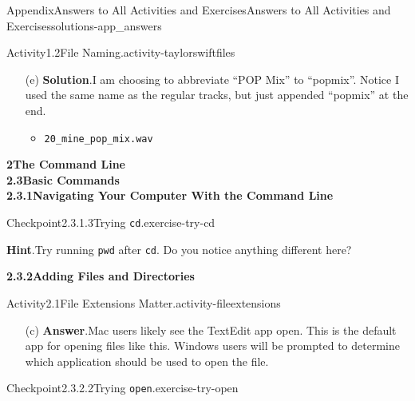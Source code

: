 \documentclass[oneside,10pt,]{book}
\newcommand{\blocktitlefont}{\relax}
\newcommand{\mono}[1]{\texttt{#1}}
\begin{document}
\begin{solutions-chapter}{Appendix}{Answers to All Activities and Exercises}{}{Answers to All Activities and Exercises}{}{}{solutions-app_answers}
\begin{activitysolution}{Activity}{1.2}{File Naming.}{activity-taylorswiftfiles}
\begin{enumerate}[font=\bfseries,label=(\alph*),ref=\alph*]
\begin{itemize}[label=\textbullet]
\item{}\mono{18\_back\_to\_dec\_acoust.wav}%
\item{}\mono{19\_haunted\_acoust.wav}%
\end{itemize}
%
\item[(e)]\noindent\textbf{\blocktitlefont Solution}.\hypertarget{solution-taylorswiftfiles-h-b-back}{}\quad{}I am choosing to abbreviate ``POP Mix'' to ``pop\textunderscore{}mix''. Notice I used the same name as the regular tracks, but just appended ``\textunderscore{}pop\textunderscore{}mix'' at the end.%
\begin{itemize}[label=\textbullet]
\item{}\mono{20\_mine\_pop\_mix.wav}%
\end{itemize}
%
\end{enumerate}%
\end{activitysolution}%
\par\medskip
\noindent\textbf{\Large{}2\space\textperiodcentered\space{}The Command Line\\
2.3\space\textperiodcentered\space{}Basic Commands\\
2.3.1\space\textperiodcentered\space{}Navigating Your Computer With the Command Line}
\begin{inlinesolution}{Checkpoint}{2.3.1.3}{Trying \mono{cd}.}{exercise-try-cd}%
\par\smallskip%
\noindent\textbf{\blocktitlefont Hint}.\hypertarget{hint-try-cd-c-back}{}\quad{}Try running \mono{pwd} after \mono{cd}. Do you notice anything different here?%
\end{inlinesolution}%
\par\medskip
\noindent\textbf{\Large{}2.3.2\space\textperiodcentered\space{}Adding Files and Directories}
\begin{activitysolution}{Activity}{2.1}{File Extensions Matter.}{activity-fileextensions}%
\begin{enumerate}[font=\bfseries,label=(\alph*),ref=\alph*]%
\item[(c)]\noindent\textbf{\blocktitlefont Answer}.\hypertarget{answer-fileextensions-g-b-back}{}\quad{}Mac users likely see the TextEdit app open. This is the default app for opening files like this. Windows users will be prompted to determine which application should be used to open the file.%
\end{enumerate}%
\end{activitysolution}%
\begin{inlinesolution}{Checkpoint}{2.3.2.2}{Trying \mono{open}.}{exercise-try-open}%

\end{inlinesolution}
\end{solutions-chapter}
\end{document}

